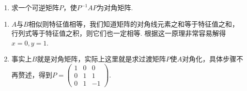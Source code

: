 \begin{exercise}
\begin{exgroup}
\begin{enumerate}
            \item 求一个可逆矩阵$P$，使$P^{-1}AP$为对角矩阵.
        \end{enumerate}
        \begin{answer}
            \begin{enumerate}
                \item $A$与$B$相似则特征值相等，我们知道矩阵的对角线元素之和等于特征值之和，行列式等于特征值之积，则它们也一定相等. 根据这一原理非常容易解得$x=0,y=1$.

                \item 事实上$B$就是对角矩阵，实际上这里就是求过渡矩阵$P$使$A$对角化，具体步骤不再赘述，得到$P=\begin{pmatrix}
                              1 & 0 & 0 \\ 0 & 1 & 1 \\ 0 & 1 & -1
                          \end{pmatrix}$.
            \end{enumerate}
        \end{answer}


\end{exgroup}
\end{exercise}
